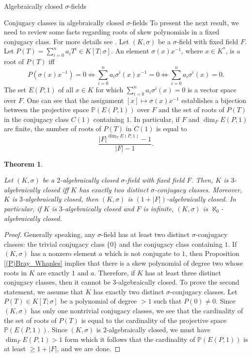 \documentclass[11pt,a4paper]{article}
\theoremstyle{theorem}
\newtheorem{theorem}{Theorem}[section]
\numberwithin{equation}{section}
\newcommand{\s}{\sigma}
\begin{document}
\begin{section}{Algebraically closed $\s$-fields}
\begin{subsection}{Conjugacy classes in algebraically closed $\s$-fields}
	To present the next result, we need to review some facts regarding roots of skew polynomials in  a fixed conjugacy class. For more details see \cite{LamLeroy1988, lamleroy1988algebraic}. Let $(K,\s)$ be a $\s$-field with fixed field $F$.
	Let $P(T)=\sum_{i=0}^na_iT^i\in K[T;\s]$. 
	An element $\s(x)x^{-1}$, where $x\in K^*$, is a root  of $P(T)$ iff
	$$P(\s(x)x^{-1})=0\iff \sum_{i=0}^na_i\s^i(x)x^{-1}=0\iff \sum_{i=0}^na_i\s^i(x)=0.$$
	The set $E(P,1)$ of all $x\in K$ for which $\sum_{i=0}^na_i\s^i(x)=0$ is a vector space over $F$. One can see that the assignment $[x]\mapsto \s(x)x^{-1}$ establishes a bijection between the projective space $\mathbb{P}(E(P,1))$ over $F$ and the set of roots of 
	$P(T)$ in the conjugacy class $C(1)$ containing $1$. In particular, if $F$ and $\dim_F E(P,1)$ are finite,  the number of roots of $P(T)$ in $C(1)$ is equal to
	$$\frac{|F|^{\dim_F E(P,1)}-1}{|F|-1}.$$	
	\begin{theorem}\label{(T)conjugacyclasses3-algebraic}
		
		Let $(K,\s)$ be a $2$-algebraically closed $\s$-field with fixed field $F$. Then, $K$ is $3$-algebraically closed iff $K$ has exactly two distinct $\s$-conjugacy classes. Moreover, $K$ is $3$-algebraically closed, then $(K,\s)$ is $(1+|F|)$-algebraically closed. In particular, if $K$ is $3$-algebraically closed and  $F$ is infinite,  $(K,\s)$  is $\aleph_0$-algebraically closed. 
	\end{theorem}
	\begin{proof}
		Generally speaking, any $\s$-field has at least two distinct  $\s$-conjugacy classes: the trivial conjugacy class $\{0\}$ and the conjugacy class containing $1$. If $(K,\s)$  has a nonzero element $a$ which is not conjugate to $1$, then Proposition \ref{(P)Bray_Whaples} implies that there is a skew polynomial of degree two whose roots in $K$ are exactly $1$ and $a$. Therefore, if $K$ has at least three distinct conjugacy classes, then it cannot be  $3$-algebraically closed. To prove the second statement, we assume that $K$ has  exactly two distinct $\s$-conjugacy classes. Let $P(T)\in K[T;\s]$ be a polynomial of degree $>1$ such that $P(0)\neq 0$. Since $(K,\s)$  has only one nontrivial conjugacy classes, we see that the cardinality of the set of roots of $P(T)$ is equal to the cardinality of the projective space $\mathbb{P}(E(P,1))$. Since $(K,\s)$ is  $2$-algebraically closed, we must have $ \dim_F E(P,1)>1$ form which it follows that the cardinality of $\mathbb{P}(E(P,1))$ is at least $\geq 1+|F|$, and we are done. 
		

\end{proof}
\end{subsection}
\end{section}
\end{document}
